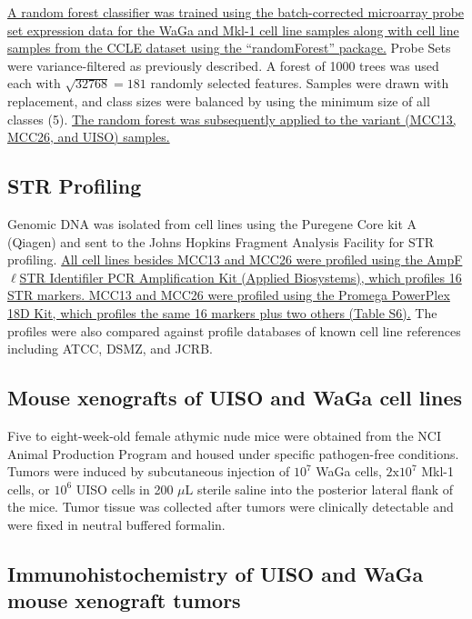 \documentclass[10pt]{article}
\begin{document}
\uline{A random forest classifier was trained using the batch-corrected microarray probe set expression data for the WaGa and Mkl-1 cell line samples along with cell line samples from the CCLE dataset using the ``randomForest'' package.}
Probe Sets were variance-filtered as previously described.
A forest of 1000 trees was used each with $\sqrt{32768}=181$ randomly selected features.
Samples were drawn with replacement, and class sizes were balanced by using the minimum size of all classes (5).
\uline{The random forest was subsequently applied to the variant (MCC13, MCC26, and UISO) samples.}

\subsection*{STR Profiling}

Genomic DNA was isolated from cell lines using the Puregene Core kit A (Qiagen) and sent to the Johns Hopkins Fragment Analysis Facility for STR profiling.
\uline{All cell lines besides MCC13 and MCC26 were profiled using the AmpF$\ell$STR Identifiler PCR Amplification Kit (Applied Biosystems), which profiles 16 STR markers.
MCC13 and MCC26 were profiled using the Promega PowerPlex 18D Kit, which profiles the same 16 markers plus two others (Table S6).}
The profiles were also compared against profile databases of known cell line references including ATCC, DSMZ, and JCRB.

\subsection*{Mouse xenografts of UISO and WaGa cell lines}

Five to eight-week-old female athymic nude mice were obtained from the NCI Animal Production Program and housed under specific pathogen-free conditions.
Tumors were induced by subcutaneous injection of $10^7$ WaGa cells, $2\mathrm{x}10^7$ Mkl-1 cells, or $10^6$ UISO cells in 200 $\mu\mathrm{L}$ sterile saline into the posterior lateral flank of the mice.
Tumor tissue was collected after tumors were clinically detectable and were fixed in neutral buffered formalin.

\subsection*{Immunohistochemistry of UISO and WaGa mouse xenograft tumors}
\end{document}
